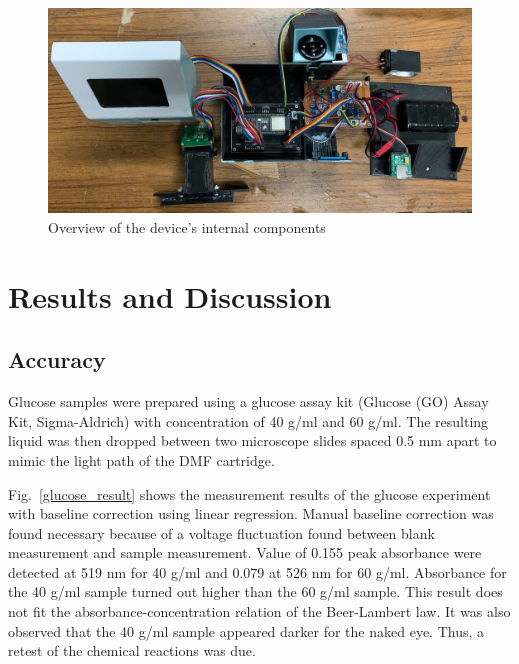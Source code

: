\documentclass[conference]{IEEEtran}
\begin{document}
    \begin{figure}[htbp]
    \centerline{\includegraphics[scale=0.15]{hardware-2.jpg}}
    \caption{Overview of the device's internal components}
    \label{hardware}
    \end{figure}

\section{Results and Discussion}
\subsection{Accuracy}
Glucose samples were prepared using a glucose assay kit (Glucose (GO) Assay Kit, Sigma-Aldrich\cite{b7}) with concentration of 40 {\textmu}g/ml and 60 {\textmu}g/ml.
The resulting liquid was then dropped between two microscope slides spaced 0.5 mm apart to mimic the light path of the DMF cartridge.

Fig.~\ref{glucose_result} shows the measurement results of the glucose experiment with baseline correction using linear regression.
Manual baseline correction was found necessary because of a voltage fluctuation found between blank measurement and sample measurement.
Value of 0.155 peak absorbance were detected at 519 nm for 40 {\textmu}g/ml and 0.079 at 526 nm for 60 {\textmu}g/ml.
Absorbance for the 40 {\textmu}g/ml sample turned out higher than the 60 {\textmu}g/ml sample.
This result does not fit the absorbance-concentration relation of the Beer-Lambert law.
It was also observed that the 40 {\textmu}g/ml sample appeared darker for the naked eye.
Thus, a retest of the chemical reactions was due.
\end{document}
